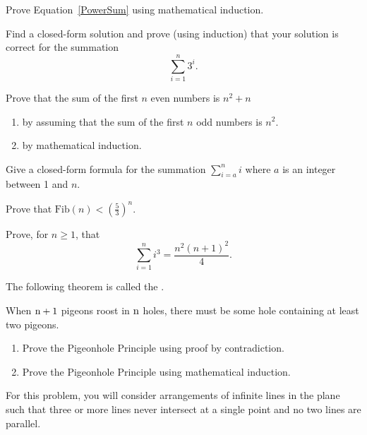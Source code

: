 \begin{exercises}
\item
Prove Equation~\ref{PowerSum} using mathematical
induction.

\item
Find a closed-form solution and prove (using induction) that your
solution is correct for the summation
\[\sum_{i=1}^n 3^i.\]

\item
Prove that the sum of the first \(n\) even numbers is \(n^2 + n\)

\begin{enumerate}
\item by assuming that the sum of the first \(n\) odd
numbers is \(n^2\).

\item by mathematical induction.
\end{enumerate}

\item
Give a closed-form formula for the summation
\(\sum_{i=a}^n i\) where \(a\) is an integer between 1 and \(n\).

\item
Prove that \(\mbox{Fib}(n) < (\frac{5}{3})^n\).

\item
Prove, for \(n \geq 1\), that
\[\sum_{i=1}^n i^3 = \frac{n^2(n+1)^2}{4}.\]

\item
\label{pigeon}
The following theorem is called the .

\begin{theorem}
When \({\rm n+1}\) pigeons roost in \({\rm n}\) holes, there must be
some hole containing at least two pigeons.
\end{theorem}

\begin{enumerate}
\item Prove the Pigeonhole Principle using proof by
contradiction.

\item Prove the Pigeonhole Principle using mathematical
induction.
\end{enumerate}

\item
For this problem, you will consider arrangements of infinite lines in
the plane such that three or more lines never intersect at a single
point and no two lines are parallel.


\end{exercises}

